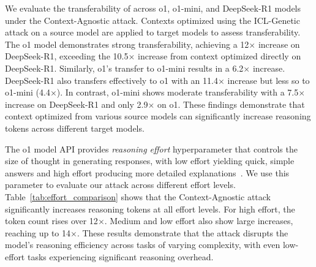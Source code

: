 


We evaluate the transferability of \sys across o1, o1-mini, and DeepSeek-R1 models under the Context-Agnostic attack. Contexts optimized using the ICL-Genetic attack on a source model are applied to target models to assess transferability. The o1 model demonstrates strong transferability, achieving a 12$\times$ increase on DeepSeek-R1, exceeding the 10.5$\times$ increase from context optimized directly on DeepSeek-R1. Similarly, o1's transfer to o1-mini results in a 6.2$\times$ increase. DeepSeek-R1 also transfers effectively to o1 with an 11.4$\times$ increase but less so to o1-mini (4.4$\times$). In contrast, o1-mini shows moderate transferability with a 7.5$\times$ increase on DeepSeek-R1 and only 2.9$\times$ on o1. These findings demonstrate that context optimized from various source models can significantly increase reasoning tokens across different target models. 




The o1 model API provides \textit{reasoning effort} hyperparameter that controls the size of thought in generating responses, with low effort yielding quick, simple answers and high effort producing more detailed explanations~\cite{openai_reasoning_effort, openai_reasoning_guide}. We use this parameter to evaluate our attack across different effort levels. Table~\ref{tab:effort_comparison} shows that the Context-Agnostic attack significantly increases reasoning tokens at all effort levels. For high effort, the token count rises over 12$\times$. Medium and low effort also show large increases, reaching up to 14$\times$. These results demonstrate that the attack disrupts the model's reasoning efficiency across tasks of varying complexity, with even low-effort tasks experiencing significant reasoning overhead.














 

    



